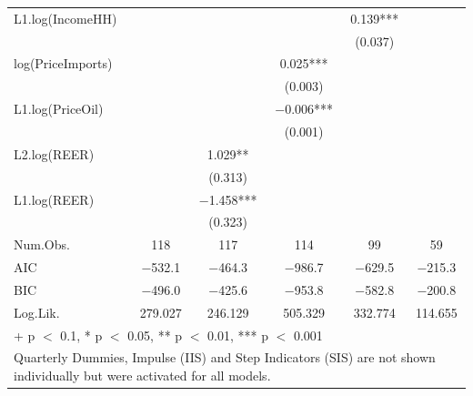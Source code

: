 \begin{table}
{\begin{tabular}[t]{lccccc}
L1.log(IncomeHH) &  &  &  & \num{0.139}*** & \\
 &  &  &  & (\num{0.037}) & \\
log(PriceImports) &  &  & \num{0.025}*** &  & \\
 &  &  & (\num{0.003}) &  & \\
L1.log(PriceOil) &  &  & \num{-0.006}*** &  & \\
 &  &  & (\num{0.001}) &  & \\
L2.log(REER) &  & \num{1.029}** &  &  & \\
 &  & (\num{0.313}) &  &  & \\
L1.log(REER) &  & \num{-1.458}*** &  &  & \\
 &  & (\num{0.323}) &  &  & \\
\midrule
Num.Obs. & \num{118} & \num{117} & \num{114} & \num{99} & \num{59}\\
AIC & \num{-532.1} & \num{-464.3} & \num{-986.7} & \num{-629.5} & \num{-215.3}\\
BIC & \num{-496.0} & \num{-425.6} & \num{-953.8} & \num{-582.8} & \num{-200.8}\\
Log.Lik. & \num{279.027} & \num{246.129} & \num{505.329} & \num{332.774} & \num{114.655}\\
\bottomrule
\multicolumn{6}{l}{\rule{0pt}{1em}+ p $<$ 0.1, * p $<$ 0.05, ** p $<$ 0.01, *** p $<$ 0.001}\\
\multicolumn{6}{l}{\rule{0pt}{1em}Quarterly Dummies, Impulse (IIS) and Step Indicators (SIS) are not shown individually but were activated for all models.}\\
\end{tabular}}
\end{table}
